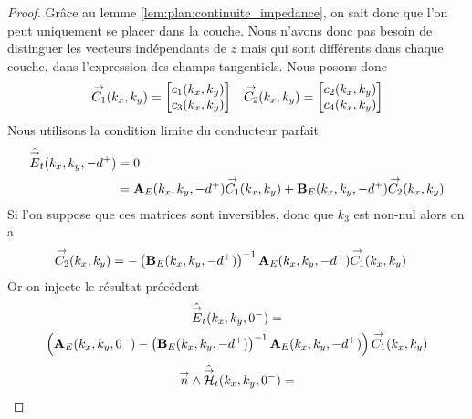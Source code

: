         \begin{proof}
            Grâce au lemme \eqref{lem:plan:continuite_impedance}, on sait donc que l'on peut uniquement se placer dans la couche. Nous n'avons donc pas besoin de distinguer les vecteurs indépendants de \(z\) mais qui sont différents dans chaque couche, dans l'expression des champs tangentiels. Nous posons donc
            \begin{align*}
                {\overset{\rightarrow}{C_1}}(k_x,k_y) = \begin{bmatrix}c_1(k_x,k_y) \\ c_3(k_x,k_y)\end{bmatrix} 
                && 
                {\overset{\rightarrow}{C_2}}(k_x,k_y) = \begin{bmatrix}c_2(k_x,k_y) \\ c_4(k_x,k_y)\end{bmatrix}
            \end{align*}
            Nous utilisons la condition limite du conducteur parfait
            \begin{align*}
                \hat{{\overset{\rightarrow}{E}}}_t(k_x,k_y,-d^+) &= 0
                \\
                &=  \mathbf{A}_E(k_x,k_y,-d^+){\overset{\rightarrow}{C_1}}(k_x,k_y) + \mathbf{B}_E(k_x,k_y,-d^+){\overset{\rightarrow}{C_2}}(k_x,k_y)
            \end{align*}
            Si l’on suppose que ces matrices sont inversibles, donc que \(k_3\) est non-nul alors on a
            \begin{align*}
                {\overset{\rightarrow}{C_2}}(k_x,k_y) &= -\left(\mathbf{B}_E(k_x,k_y,-d^+)\right)^{-1}\mathbf{A}_E(k_x,k_y,-d^+){\overset{\rightarrow}{C_1}}(k_x,k_y)
            \end{align*}
            Or on injecte le résultat précédent
            \begin{multline*}
                \hat {{\overset{\rightarrow}{E}}}_t(k_x,k_y,0^-) =
                \\
                \left(\mathbf{A}_E(k_x,k_y,0^-)-\left(\mathbf{B}_E(k_x,k_y,-d^+)\right)^{-1}\mathbf{A}_E(k_x,k_y,-d^+)\right){\overset{\rightarrow}{C_1}}(k_x,k_y)
            \end{multline*}
            \begin{multline*}
                \vn \pvect \hat \vH_t(k_x,k_y,0^-) =
                \\

\end{multline*}
\end{proof}
